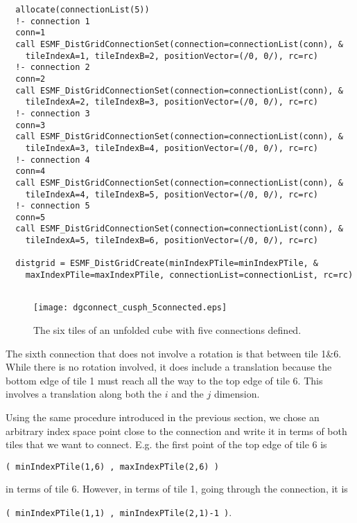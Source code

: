  \begin{verbatim}
  allocate(connectionList(5))
  !- connection 1
  conn=1
  call ESMF_DistGridConnectionSet(connection=connectionList(conn), &
    tileIndexA=1, tileIndexB=2, positionVector=(/0, 0/), rc=rc)
  !- connection 2
  conn=2
  call ESMF_DistGridConnectionSet(connection=connectionList(conn), &
    tileIndexA=2, tileIndexB=3, positionVector=(/0, 0/), rc=rc)
  !- connection 3
  conn=3
  call ESMF_DistGridConnectionSet(connection=connectionList(conn), &
    tileIndexA=3, tileIndexB=4, positionVector=(/0, 0/), rc=rc)
  !- connection 4
  conn=4
  call ESMF_DistGridConnectionSet(connection=connectionList(conn), &
    tileIndexA=4, tileIndexB=5, positionVector=(/0, 0/), rc=rc)
  !- connection 5
  conn=5
  call ESMF_DistGridConnectionSet(connection=connectionList(conn), &
    tileIndexA=5, tileIndexB=6, positionVector=(/0, 0/), rc=rc)

  distgrid = ESMF_DistGridCreate(minIndexPTile=minIndexPTile, &
    maxIndexPTile=maxIndexPTile, connectionList=connectionList, rc=rc)
 
\end{verbatim}
 

   
   \begin{figure}[h]
     \caption{The six tiles of an unfolded cube with five connections defined.}
     \centering
     \texttt{[image: dgconnect\_cusph\_5connected.eps]}
     \label{fig:dgconnect_cusph_5connected}
   \end{figure}
  
   The sixth connection that does not involve a rotation is that between tile
   1\&6. While there is no rotation involved, it does include a translation
   because the bottom edge of tile 1 must reach all the way to the top edge 
   of tile 6. This involves a translation along both the $i$ and the $j$ 
   dimension. 
  
   Using the same procedure introduced in the previous section, we chose an
   arbitrary index space point close to the connection and write it in terms
   of both tiles that we want to connect. E.g. the first point of the top 
   edge of tile 6 is
  
   {\tt ( minIndexPTile(1,6) , maxIndexPTile(2,6) )} 
  
   in terms of tile 6. However,
   in terms of tile 1, going through the connection, it is
  
   {\tt ( minIndexPTile(1,1) , minIndexPTile(2,1)-1 )}.
  
